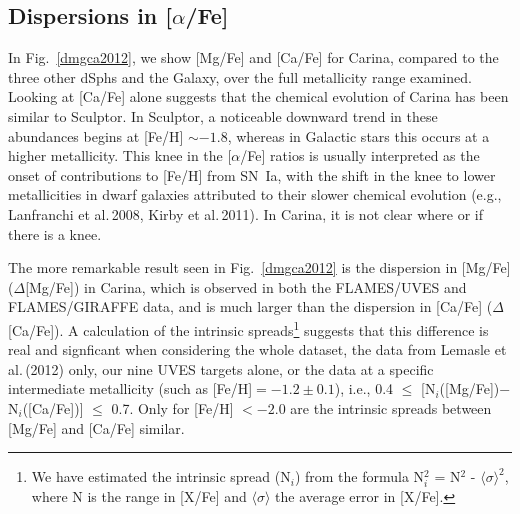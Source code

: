 \documentclass{emulateapj}
\newcommand\etal{{\rm et al.\,}}
\begin{document}
\subsection{ Dispersions in [$\alpha$/Fe] \label{dmgca}}

In Fig.~\ref{dmgca2012}, we show [Mg/Fe] and [Ca/Fe] for Carina, compared to 
the three other dSphs and the Galaxy, over the full metallicity range examined.   
Looking at [Ca/Fe] alone suggests that the chemical evolution of Carina has been 
similar to Sculptor.  In Sculptor, a noticeable downward trend 
in these abundances begins at [Fe/H] $\sim -1.8$, whereas in Galactic
stars this occurs at a higher metallicity.   This knee in the [$\alpha$/Fe] 
ratios is usually interpreted as the onset of contributions to [Fe/H] from SN~Ia, 
with the shift in the knee to lower metallicities in dwarf galaxies 
attributed to their slower chemical evolution (e.g., Lanfranchi \etal 2008,
Kirby \etal 2011).  
In Carina, it is not clear where or if there is a knee.

The more remarkable result seen in Fig.~\ref{dmgca2012} 
is the dispersion in [Mg/Fe] ($\Delta$[Mg/Fe]) in Carina, which
is observed in both the FLAMES/UVES and FLAMES/GIRAFFE data, and is much larger 
than the dispersion in [Ca/Fe] ($\Delta$[Ca/Fe]).  
A calculation of the intrinsic spreads\footnote{We have estimated the intrinsic
spread (N$_i$) from the formula N$_i^2$ = N$^2$ - $\langle\sigma\rangle^2$, where
N is the range in [X/Fe] and $\langle\sigma\rangle$ the average error in [X/Fe].} 
suggests that this difference is real and signficant when considering the whole 
dataset, the data from Lemasle \etal (2012) only, 
our nine UVES targets alone,
or the data at a specific intermediate metallicity (such as [Fe/H]$=-1.2\pm0.1$),
i.e., 0.4 $\le$ [N$_i$([Mg/Fe])$-$N$_i$([Ca/Fe])] $\le$ 0.7. 
Only for [Fe/H] $< -2.0$ are the intrinsic spreads between [Mg/Fe] and [Ca/Fe] similar.     
\end{document}
